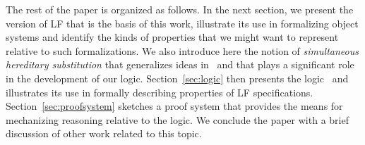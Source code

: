 The rest of the paper is organized as follows.
%
In the next section, we present the version of LF that is the basis of
this work, illustrate its use in formalizing object systems and
identify the kinds of properties that we might want to represent
relative to such formalizations. 
%
We also introduce here the notion of  \emph{simultaneous
hereditary substitution} that generalizes ideas in~\cite{harper07jfp}
and that plays a significant role in the development of our logic. 
%
Section~\ref{sec:logic} then presents the logic \logic\ and illustrates
its use in formally describing properties of LF specifications. 
%
Section~\ref{sec:proofsystem} sketches a proof system that provides
the means for mechanizing reasoning relative to the logic. 
%
We conclude the paper with a brief discussion of other work related to
this topic. 
